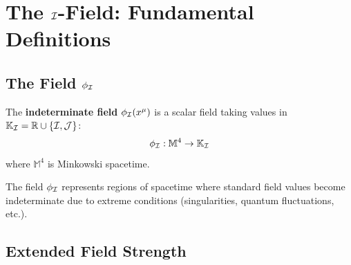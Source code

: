 \section{The $\I$-Field: Fundamental Definitions}

\subsection{The Field $\phi_{\mathcal{I}}$}

\begin{definition}[$\I$-Field]
The \textbf{indeterminate field} $\phi_{\mathcal{I}}(x^\mu)$ is a scalar field taking values in $\mathbb{K}_{\mathcal{I}} = \mathbb{R} \cup \{\mathcal{I}, \mathcal{J}\}$:
\[
\phi_{\mathcal{I}} : \mathbb{M}^4 \to \mathbb{K}_{\mathcal{I}}
\]
where $\mathbb{M}^4$ is Minkowski spacetime.
\end{definition}

The field $\phi_{\mathcal{I}}$ represents regions of spacetime where standard field values become indeterminate due to extreme conditions (singularities, quantum fluctuations, etc.).

\subsection{Extended Field Strength}

